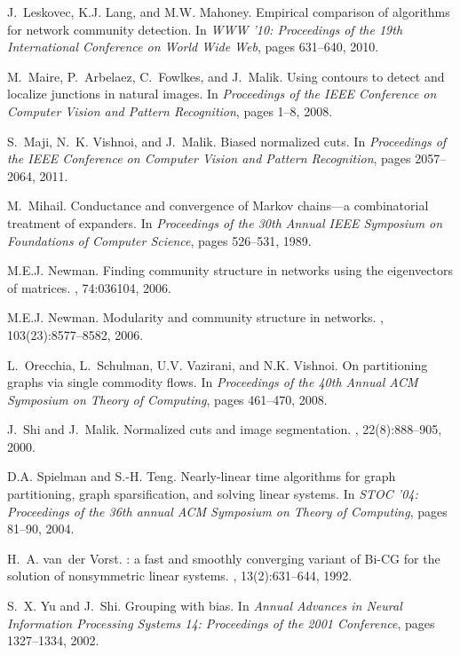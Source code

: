 \documentclass[11pt]{article}
\begin{document}
\begin{thebibliography}{10}
J.~Leskovec, K.J. Lang, and M.W. Mahoney.
\newblock Empirical comparison of algorithms for network community detection.
\newblock In {\em WWW '10: Proceedings of the 19th International Conference on
  World Wide Web}, pages 631--640, 2010.

M.~Maire, P.~Arbelaez, C.~Fowlkes, and J.~Malik.
\newblock Using contours to detect and localize junctions in natural images.
\newblock In {\em Proceedings of the IEEE Conference on Computer Vision and
  Pattern Recognition}, pages 1--8, 2008.

S.~Maji, N.~K. Vishnoi, and J.~Malik.
\newblock Biased normalized cuts.
\newblock In {\em Proceedings of the IEEE Conference on Computer Vision and
  Pattern Recognition}, pages 2057--2064, 2011.

M.~Mihail.
\newblock Conductance and convergence of {M}arkov chains---a combinatorial
  treatment of expanders.
\newblock In {\em Proceedings of the 30th Annual IEEE Symposium on Foundations
  of Computer Science}, pages 526--531, 1989.

M.E.J. Newman.
\newblock Finding community structure in networks using the eigenvectors of
  matrices.
, 74:036104, 2006.

M.E.J. Newman.
\newblock Modularity and community structure in networks.
, 103(23):8577--8582, 2006.

L.~Orecchia, L.~Schulman, U.V. Vazirani, and N.K. Vishnoi.
\newblock On partitioning graphs via single commodity flows.
\newblock In {\em Proceedings of the 40th Annual ACM Symposium on Theory of
  Computing}, pages 461--470, 2008.

J.~Shi and J.~Malik.
\newblock Normalized cuts and image segmentation.
,
  22(8):888--905, 2000.

D.A. Spielman and S.-H. Teng.
\newblock Nearly-linear time algorithms for graph partitioning, graph
  sparsification, and solving linear systems.
\newblock In {\em STOC '04: Proceedings of the 36th annual ACM Symposium on
  Theory of Computing}, pages 81--90, 2004.

H.~A. van~der Vorst.
: a fast and smoothly converging variant of {Bi-CG} for
  the solution of nonsymmetric linear systems.
, 13(2):631--644, 1992.

S.~X. Yu and J.~Shi.
\newblock Grouping with bias.
\newblock In {\em Annual Advances in Neural Information Processing Systems 14:
  Proceedings of the 2001 Conference}, pages 1327--1334, 2002.

\end{thebibliography}
\end{document}
